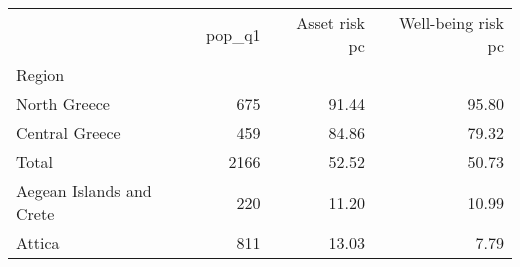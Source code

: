 \begin{tabular}{lrrr}
\toprule
{} &  pop\_q1 &  Asset risk pc &  Well-being risk pc \\
Region                   &         &                &                     \\
\midrule
North Greece             &     675 &          91.44 &               95.80 \\
Central Greece           &     459 &          84.86 &               79.32 \\
Total                    &    2166 &          52.52 &               50.73 \\
Aegean Islands and Crete &     220 &          11.20 &               10.99 \\
Attica                   &     811 &          13.03 &                7.79 \\
\bottomrule
\end{tabular}
